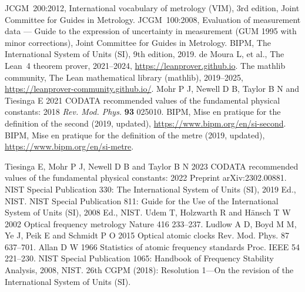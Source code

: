 \documentclass[11pt]{article}
\theoremstyle{plain}
\theoremstyle{definition}
\theoremstyle{remark}
\begin{document}
\begin{thebibliography}{9}
 JCGM~200:2012, International vocabulary of metrology (VIM), 3rd edition, Joint Committee for Guides in Metrology.
 JCGM~100:2008, Evaluation of measurement data — Guide to the expression of uncertainty in measurement (GUM 1995 with minor corrections), Joint Committee for Guides in Metrology.
 BIPM, The International System of Units (SI), 9th edition, 2019.
 de Moura L, et al., The Lean~4 theorem prover, 2021--2024, \url{https://leanprover.github.io}.
 The mathlib community, The Lean mathematical library (mathlib), 2019--2025, \url{https://leanprover-community.github.io/}.
 Mohr P J, Newell D B, Taylor B N and Tiesinga E 2021 CODATA recommended values of the fundamental physical constants: 2018 \textit{Rev. Mod. Phys.} \textbf{93} 025010.
 BIPM, Mise en pratique for the definition of the second (2019, updated), \url{https://www.bipm.org/en/si-second}.
 BIPM, Mise en pratique for the definition of the metre (2019, updated), \url{https://www.bipm.org/en/si-metre}.

 Tiesinga E, Mohr P J, Newell D B and Taylor B N 2023 CODATA recommended values of the fundamental physical constants: 2022 Preprint arXiv:2302.00881.
 NIST Special Publication 330: The International System of Units (SI), 2019 Ed., NIST.
 NIST Special Publication 811: Guide for the Use of the International System of Units (SI), 2008 Ed., NIST.
 Udem T, Holzwarth R and Hänsch T W 2002 Optical frequency metrology Nature 416 233–237.
 Ludlow A D, Boyd M M, Ye J, Peik E and Schmidt P O 2015 Optical atomic clocks Rev. Mod. Phys. 87 637–701.
 Allan D W 1966 Statistics of atomic frequency standards Proc. IEEE 54 221–230.
 NIST Special Publication 1065: Handbook of Frequency Stability Analysis, 2008, NIST.
 26th CGPM (2018): Resolution 1—On the revision of the International System of Units (SI).



\end{thebibliography}
\end{document}
